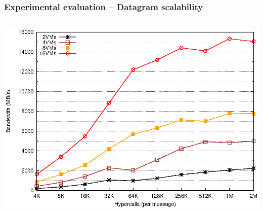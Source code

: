 \documentclass[red,slidestop,notes,compress,mathserif]{beamer}
\begin{document}
\begin{frame}
\frametitle{Experimental evaluation -- Datagram scalability}
\begin{columns}
\includegraphics[width=\textwidth]{figures/bw_dgram_scale.eps}
\end{columns}
\end{frame}
\end{document}
